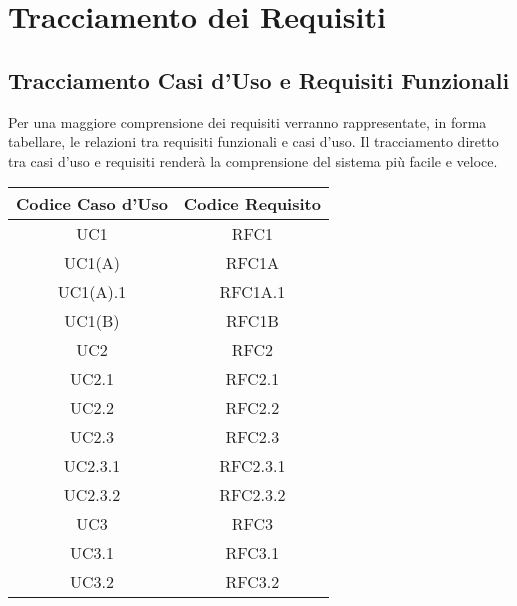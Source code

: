 \section{Tracciamento dei Requisiti}

\subsection{Tracciamento Casi d'Uso e Requisiti Funzionali}
Per una maggiore comprensione dei requisiti verranno rappresentate, in forma tabellare, le relazioni tra requisiti funzionali e casi d'uso. Il tracciamento diretto tra casi d'uso e requisiti renderà la comprensione del sistema più facile e veloce.

\begin{table}[!htbp] %
            \centering
            \renewcommand{\arraystretch}{2} %
            \begin{tabular}{|c|c|} %
                \rowcolor{orange!50} %
        		\hline
        		\textbf{Codice Caso d'Uso} & \textbf{Codice Requisito} \\
                \hline
                UC1 & RFC1\\
                \hline
                UC1(A) & RFC1A\\
                \hline
                UC1(A).1 & RFC1A.1\\
                \hline
                UC1(B) & RFC1B\\
                \hline
                UC2 & RFC2\\
                \hline
                UC2.1 & RFC2.1\\
                \hline
                UC2.2 & RFC2.2\\
                \hline
                UC2.3 & RFC2.3\\
                \hline
                UC2.3.1 & RFC2.3.1\\
                \hline
                UC2.3.2 & RFC2.3.2\\
                \hline
                UC3 & RFC3\\
                \hline
                UC3.1 & RFC3.1\\
                \hline
                UC3.2 & RFC3.2\\
                \hline
                \end{tabular}
        \end{table}
